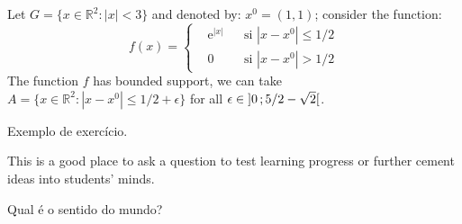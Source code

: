             \begin{example}
                Let $G=\{x\in\mathbb{R}^2:|x|<3\}$ and denoted by: $x^0=(1,1)$; consider the function:
                \begin{equation}
                    f(x)=\left\{\begin{aligned} & \mathrm{e}^{|x|} & & \text{si $|x-x^0|\leq 1/2$}\\
                    & 0 & & \text{si $|x-x^0|> 1/2$}\end{aligned}\right.
                \end{equation}
                The function $f$ has bounded support, we can take $A=\{x\in\mathbb{R}^2:|x-x^0|\leq 1/2+\epsilon\}$ for all $\epsilon\in\mathopen{]}0\,;5/2-\sqrt{2}\mathclose{[}$.
            \end{example}
            \begin{example}
                \lipsum[2]
            \end{example}



        Exemplo de exercício.
        \begin{exercise}
            This is a good place to ask a question to test learning progress or further cement ideas into students' minds.
        \end{exercise}



        \begin{problem}
            Qual é o sentido do mundo?
        \end{problem}





